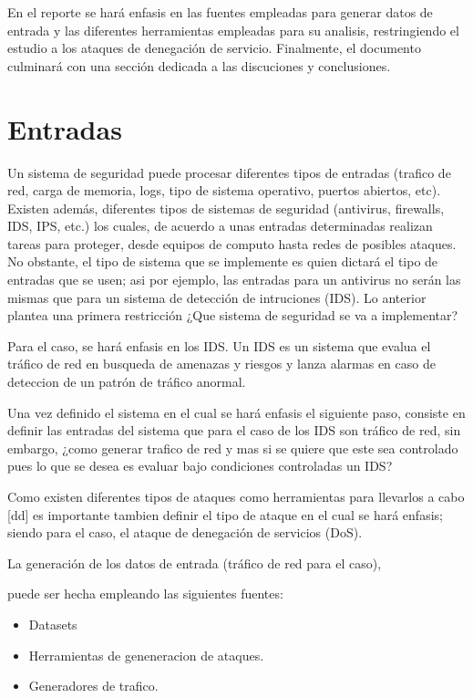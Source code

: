 \documentclass[12pt]{article}
\begin{document}
En el reporte se hará enfasis en las fuentes empleadas para generar datos de entrada y las diferentes herramientas empleadas para su analisis, restringiendo el estudio a los ataques de denegación de servicio. Finalmente, el documento culminará con una sección dedicada a las discuciones y conclusiones.

\section{Entradas}

Un sistema de seguridad puede procesar diferentes tipos de entradas (trafico de red, carga de memoria, logs, tipo de sistema operativo, puertos abiertos, etc). Existen además, diferentes tipos de sistemas de seguridad (antivirus, firewalls, IDS, IPS, etc.) los cuales, de acuerdo a unas entradas determinadas realizan tareas para proteger, desde equipos de computo hasta redes de posibles ataques. No obstante, el tipo de sistema que se implemente es quien dictará el tipo de entradas que se usen; asi por ejemplo, las entradas para un antivirus no serán las mismas que para un sistema de detección de intruciones (IDS). Lo anterior plantea una primera restricción ¿Que sistema de seguridad se va a implementar?

Para el caso, se hará enfasis en los IDS. Un IDS es un sistema que evalua el tráfico de red en busqueda de amenazas y riesgos y lanza alarmas en caso de deteccion de un patrón de tráfico anormal. 

Una vez definido el sistema en el cual se hará enfasis el siguiente paso, consiste en definir las entradas del sistema que para el caso de los IDS son tráfico de red, sin embargo, ¿como generar trafico de red y mas si se quiere que este sea controlado pues lo que se desea es evaluar bajo condiciones controladas un IDS?

Como existen diferentes tipos de ataques como herramientas para llevarlos a cabo [dd] es importante tambien definir el tipo de ataque en el cual se hará enfasis; siendo para el caso, el ataque de denegación de servicios (DoS). 

 La generación de los datos de entrada (tráfico de red para el caso), 

puede ser hecha empleando las siguientes fuentes:
\begin{itemize}
\item Datasets
\item Herramientas de geneneracion de ataques.
\item Generadores de trafico.
\end{itemize}
\end{document}
